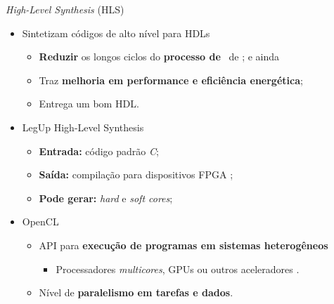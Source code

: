    
      \begin{frame}{\textit{High-Level Synthesis} (HLS)} \vspace{-1em}
         \begin{itemize}
            \setlength{\itemsep}{0.9em}
            \item Sintetizam códigos de alto nível para HDLs \cite{Choi2016} \cite{Trevett2008}
            \begin{itemize}
               \setlength{\itemsep}{0.2em}
               \item \textbf{Reduzir} os longos ciclos do \textbf{processo de \design}\ de \hardware; e ainda
               \item Traz \textbf{melhoria em performance e eficiência energética};
               \item Entrega um bom HDL.
            \end{itemize}
            
               \bigskip
            
            \item LegUp High-Level Synthesis
            \begin{itemize}
               \setlength{\itemsep}{0.2em}
               \item \textbf{Entrada:} código padrão \textit{C};
               \item \textbf{Saída:} compilação para dispositivos FPGA \cite{Canis2011};
               \item \textbf{Pode gerar:} \textit{hard} e \textit{soft cores};
            \end{itemize}
           
            \item OpenCL
            \begin{itemize}
               \setlength{\itemsep}{0.2em}
               \item API para \textbf{execução de programas em sistemas heterogêneos}
               \begin{itemize}
                  \item Processadores \textit{multicores}, GPUs ou outros aceleradores \cite{Shagrithaya2013, Czajkowski2012}. 
               \end{itemize}
               
               \item Nível de \textbf{paralelismo em tarefas e dados}.
               
            \end{itemize}
            
         \end{itemize}
      \end{frame}
   
